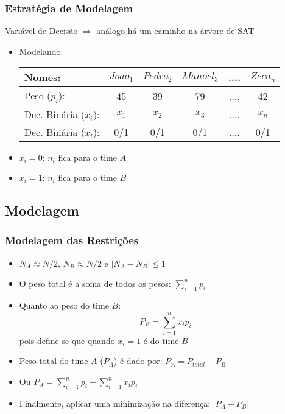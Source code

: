 \documentclass{beamer}
\begin{document}
\begin{frame}[fragile]%
\frametitle{Estratégia de Modelagem}
\begin{block}{Variável de Decisão $\Rightarrow $ análogo há um caminho na árvore de SAT}
  \begin{itemize}

\item Modelando:\\

\begin{tabular}{l|c|c|c|c|c}
\hline \hline
Nomes: & $Joao_1$ & $Pedro_2$ & $Manoel_3$ & .... & $Zeca_n$  \\ \hline
Peso ($p_i$): & 45 & 39 & 79 & .... & 42  \\ \hline
Dec. Binária ($x_i$): & $x_1$ & $x_2$ & $x_3$ & .... & $x_n$ \\ \hline
Dec. Binária ($x_i$): & 0/1 & 0/1 & 0/1 & .... & 0/1  \\ 
\hline \hline
\end{tabular}

\item $x_i = 0$: $n_i$ fica para o time $A$
\item $x_i = 1$: $n_i$ fica para o time $B$
  
  \end{itemize}
  
\end{block}
\end{frame}

\subsection{Modelagem}

\begin{frame}[fragile]%
\frametitle{Modelagem das Restrições}
\begin{block} {}   %
  \begin{itemize}
  \item $N_A \approx N/2$, $N_B \approx N/2$  e  $|N_A - N_B| \le 1$   

  \item O peso total é a soma de todos os pesos: $\sum_{i=1}^n  p_i$
  
  \item Quanto ao  peso do time $B$:
        $$P_B = \sum_{i=1}^n x_i p_i$$ pois define-se que quando $x_i=1$ é do time $B$

  \item Peso total do time $A$ ($P_A$) é dado por: $P_A = P_{total} - P_B$
  
  \item Ou $P_A = \sum_{i=1}^n p_i - \sum_{i=1}^n x_i p_i$

  \item Finalmente, aplicar uma minimização  na diferença: $|P_A - P_B|$
   
  \end{itemize}
\end{block}
\end{frame}
\end{document}
